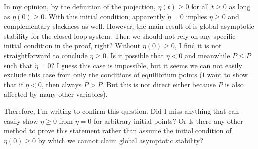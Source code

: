 \documentclass[journal,12pt,onecolumn,draftclsnofoot]{IEEEtran}
\begin{document}
In my opinion, by the definition of the projection, $\eta(t) \ge 0$ for all $t\ge 0$ as long as $\eta(0)\ge 0$. With this initial condition, apparently $\dot{\eta}=0$ implies $\eta\ge 0$ and complementary slackness as well.
However, the main result of \cite{mallada2017optimal} is global asymptotic stability for the closed-loop system. Then we should not rely on any specific initial condition in the proof, right? Without $\eta(0)\ge 0$, I find it is not straightforward to conclude $\eta \ge 0$. Is it possible that $\eta<0$ and meanwhile $P \le \overline{P}$ such that $\dot \eta =0$? I guess this case is impossible, but it seems we can not easily exclude this case from only the conditions of equilibrium points (I want to show that if $\eta<0$, then always $P>\overline{P}$. But this is not direct either because $P$ is also affected by many other variables). 

Therefore, I'm writing to confirm this question. Did I miss anything that can easily show $\eta \ge 0$ from $\dot \eta =0$ for arbitrary initial points? Or Is there any other method to prove this statement rather than assume the initial condition of $\eta(0)\ge 0$ by which we cannot claim global asymptotic stability?











  
  
\end{document}

